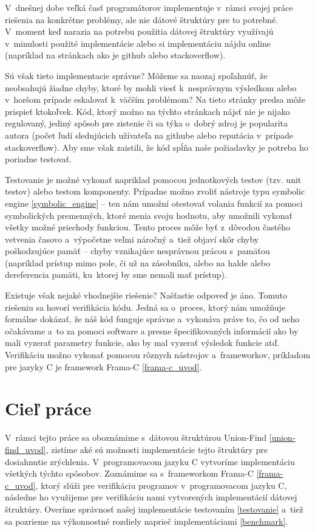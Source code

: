 \begin{introduction}

V~dnešnej dobe veľká časť programátorov implementuje v~rámci svojej práce riešenia na konkrétne problémy, ale nie dátové štruktúry pre to potrebné. V~moment keď narazia na potrebu použitia dátovej štruktúry využívajú v~minulosti použité implementácie alebo si implementáciu nájdu online (napríklad na stránkach ako je github alebo stackoverflow). 

Sú však tieto implementacie správne? Môžeme sa naozaj spoľahnúť, že neobsahujú žiadne chyby, ktoré by mohli viesť k~nesprávnym výsledkom alebo v~horšom prípade eskalovať k~väčším problémom? Na tieto stránky predsa môže prispieť ktokoľvek. Kód, ktorý možno na týchto stránkach nájsť nie je nijako regulovaný, jediný spôsob pre zistenie či sa týka o~dobrý zdroj je popularita autora (počet ľudí sledujúcich užívateľa na githube alebo reputácia v~prípade stackoverflow). Aby sme však zaistili, že kód spĺňa naše požiadavky je potreba ho poriadne testovať. 

Testovanie je možné vykonať napriklad pomocou jednotkových testov (tzv. unit testov) alebo testom komponenty. Prípadne možno zvoliť nástroje typu symbolic engine \ref{symbolic_engine} -- ten nám umožní otestovať volania funkcií za pomoci symbolických premenných, ktoré menia svoju hodnotu, aby umožnili vykonať všetky možné priechody funkciou. Tento proces môže byť z~dôvodou častého vetvenia časovo a~výpočetne veľmi náročný a~tiež objaví skôr chyby poškodzujúce pamäť -- chyby vznikajúce nesprávnou prácou s~pamäťou (napríklad prístup mimo pole, či už na zásobníku, alebo na halde alebo dereferencia pamäti, ku~ktorej by sme nemali mať prístup). 

Existuje však nejaké vhodnejšie riešenie? Našťastie odpoveď je áno. Tomuto riešeniu sa hovorí verifikácia kódu. Jedná sa o~proces, ktorý nám umožňuje formálne dokázať, že náš kód funguje správne a~vykonáva práve to, čo od neho očakávame a~to za pomoci software a presne špecifikovaných informácií ako by mali vyzerať parametry funkcie, ako by mal vyzerať výsledok funkcie atď. Verifikáciu možno vykonať pomocou rôznych nástrojov a~frameworkov, príkladom pre jazyky C je framework Frama-C \ref{frama-c_uvod}.

\section{Cieľ práce}

V~rámci tejto práce sa oboznámime s~dátovou štruktúrou Union-Find \ref{union-find_uvod}, zistíme aké sú možnosti implementácie tejto štruktúry pre dosiahnutie zrýchlenia. V~programovacom jazyku C vytvoríme implementáciu všetkých týchto spôsobov. Zoznámime sa s~frameworkom Frama-C \ref{frama-c_uvod}, ktorý slúži pre verifikáciu programov v~programovacom jazyku C, následne ho využijeme pre verifikáciu nami vytvorených implementácií dátovej štruktúry. Overíme správnosť našej implementácie testovaním \ref{testovanie} a~tiež sa pozrieme na výkonnostné rozdiely naprieč implementáciami \ref{benchmark}.

\end{introduction}